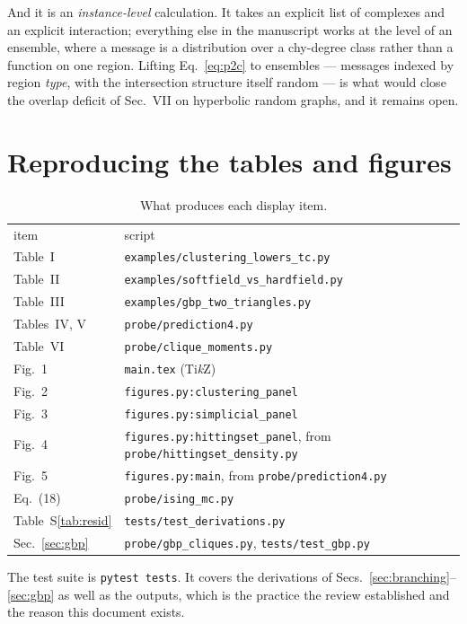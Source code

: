 \documentclass[aps,pre,onecolumn,superscriptaddress,floatfix,nofootinbib]{revtex4-2}
\newcommand{\code}[1]{\texttt{#1}}
\begin{document}
And it is an \emph{instance-level} calculation. It takes an explicit list of
complexes and an explicit interaction; everything else in the manuscript works
at the level of an ensemble, where a message is a distribution over a
chy-degree class rather than a function on one region. Lifting
Eq.~\eqref{eq:p2c} to ensembles --- messages indexed by region \emph{type}, with
the intersection structure itself random --- is what would close the overlap
deficit of Sec.~VII on hyperbolic random graphs, and it remains open.

\section{Reproducing the tables and figures}
\label{sec:repro}

\begin{table}[ht]
\caption{\label{tab:repro}What produces each display item.}
\begin{ruledtabular}
\begin{tabular}{ll}
item & script \\
\colrule
Table~I   & \code{examples/clustering\_lowers\_tc.py} \\
Table~II  & \code{examples/softfield\_vs\_hardfield.py} \\
Table~III & \code{examples/gbp\_two\_triangles.py} \\
Tables~IV, V & \code{probe/prediction4.py} \\
Table~VI  & \code{probe/clique\_moments.py} \\
Fig.~1 & \code{main.tex} (Ti\emph{k}Z) \\
Fig.~2 & \code{figures.py:clustering\_panel} \\
Fig.~3 & \code{figures.py:simplicial\_panel} \\
Fig.~4 & \code{figures.py:hittingset\_panel}, from
         \code{probe/hittingset\_density.py} \\
Fig.~5 & \code{figures.py:main}, from \code{probe/prediction4.py} \\
Eq.~(18) & \code{probe/ising\_mc.py} \\
Table~S\ref{tab:resid} & \code{tests/test\_derivations.py} \\
Sec.~\ref{sec:gbp} & \code{probe/gbp\_cliques.py}, \code{tests/test\_gbp.py} \\
\end{tabular}
\end{ruledtabular}
\end{table}

The test suite is \code{pytest tests}. It covers the derivations of
Secs.~\ref{sec:branching}--\ref{sec:gbp} as well as the outputs, which is the
practice the review established and the reason this document exists.
\end{document}

